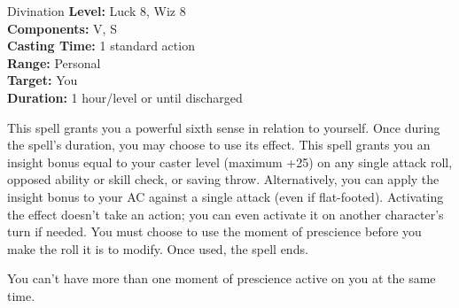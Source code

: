 {Divination}
{
	\textbf{Level:}
	Luck 8, Wiz 8\\
	\textbf{Components:}
	V, S\\
	\textbf{Casting Time:}
	1 standard action\\
	\textbf{Range:}
	Personal\\
	\textbf{Target:}
	You\\
	\textbf{Duration:}
	1 hour/level or until discharged\\
}
{
	This spell grants you a powerful sixth sense in relation to yourself. Once during the spell's duration, you may choose to use its effect. This spell grants you an insight bonus equal to your caster level (maximum +25) on any single attack roll, opposed ability or skill check, or saving throw. Alternatively, you can apply the insight bonus to your AC against a single attack (even if flat-footed). Activating the effect doesn't take an action; you can even activate it on another character's turn if needed. You must choose to use the moment of prescience before you make the roll it is to modify. Once used, the spell ends.

	You can't have more than one moment of prescience active on you at the same time.

}
